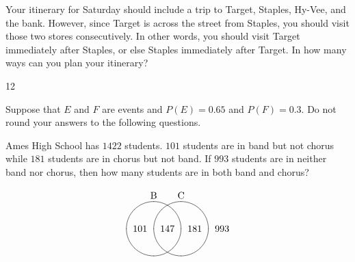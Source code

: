 \documentclass[addpoints,12pt]{exam}
\begin{document}
\begin{questions}
\question[16] Your itinerary for Saturday should
include a trip to Target, Staples, Hy-Vee, and the bank.
However, since Target is across the street from Staples,
you should visit those two stores consecutively. In other
words, you should visit Target immediately after Staples, or else
Staples immediately after Target. In how many ways
can you plan your itinerary?
\begin{solution}[4in]12\end{solution}

\question[15] Suppose that $E$ and $F$ are events
and $P\left(E\right)=0.65$ and $P\left(F\right)=0.3$.
Do not round your answers to the following questions.
\ifprintanswers\else\newpage\fi

\question[18] Ames High School has $1422$ students.
$101$ students are in band but not chorus while
$181$ students are in chorus but not band.
If $993$ students are in neither band nor chorus,
then how many students are in both band and chorus?
\begin{solution}[4in]
\[\begin{xy}<.5cm,0cm>:
(-1,2)*+!D{\text{B}};
(1,2)*+!D{\text{C}};
(-1,0)*\cir<1cm>{};
(1,0)*\cir<1cm>{};
(0,0)*{147};
(-2,0)*{101};
(2,0)*{181};
(4,0)*{993};
\end{xy}\]
\end{solution}

\end{questions}

\vfill\ifprintanswers\else
\begin{center}\gradetable[h][questions]\end{center}\fi
\end{document}
